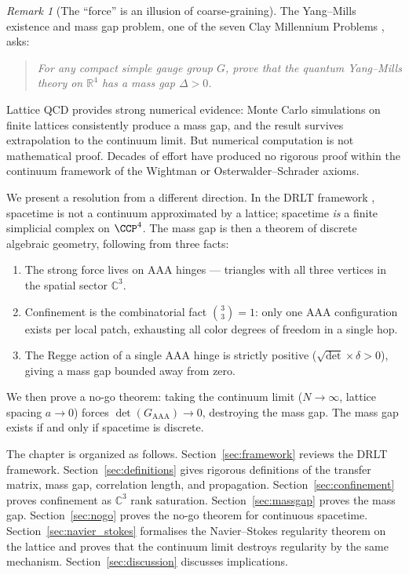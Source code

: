\documentclass[12pt]{article}
\theoremstyle{remark}
\newtheorem{remark}[theorem]{Remark}
\theoremstyle{definition}
\newcommand{\CC}{\mathbb{C}}
\newcommand{\RR}{\mathbb{R}}
\begin{document}
\begin{remark}[The ``force'' is an illusion of coarse-graining]
The Yang--Mills existence and mass gap problem, one of the seven Clay
Millennium Problems \cite{Clay}, asks:

\begin{quote}
\emph{For any compact simple gauge group $G$, prove that the quantum
Yang--Mills theory on $\RR^4$ has a mass gap $\Delta > 0$.}
\end{quote}

\noindent
Lattice QCD \cite{Wilson, Creutz} provides strong numerical evidence:
Monte Carlo simulations on finite lattices consistently produce a mass
gap, and the result survives extrapolation to the continuum limit. But
numerical computation is not mathematical proof. Decades of effort have
produced no rigorous proof within the continuum framework of the Wightman
\cite{Wightman} or Osterwalder--Schrader \cite{OS} axioms.

We present a resolution from a different direction. In the DRLT framework
, spacetime is not a continuum approximated by a
lattice; spacetime \emph{is} a finite simplicial complex on
$\CCP^4$. The mass gap is then a theorem of discrete algebraic
geometry, following from three facts:

\begin{enumerate}
\item The strong force lives on AAA hinges --- triangles with all three
  vertices in the spatial sector $\CC^3$.
\item Confinement is the combinatorial fact $\binom{3}{3} = 1$: only one
  AAA configuration exists per local patch, exhausting all color degrees
  of freedom in a single hop.
\item The Regge action of a single AAA hinge is strictly positive
  ($\sqrt{\det} \times \delta > 0$), giving a mass gap bounded away
  from zero.
\end{enumerate}

We then prove a no-go theorem: taking the continuum limit
($N \to \infty$, lattice spacing $a \to 0$) forces
$\det(G_{\mathrm{AAA}}) \to 0$, destroying the mass gap. The mass gap
exists if and only if spacetime is discrete.

The chapter is organized as follows.
Section~\ref{sec:framework} reviews the DRLT framework.
Section~\ref{sec:definitions} gives rigorous definitions of the
transfer matrix, mass gap, correlation length, and propagation.
Section~\ref{sec:confinement} proves confinement as $\CC^3$ rank
saturation.  Section~\ref{sec:massgap} proves the mass gap.
Section~\ref{sec:nogo} proves the no-go theorem for continuous
spacetime.  Section~\ref{sec:navier_stokes} formalises the
Navier--Stokes regularity theorem on the lattice and proves that
the continuum limit destroys regularity by the same mechanism.
Section~\ref{sec:discussion} discusses implications.


\end{remark}
\end{document}
